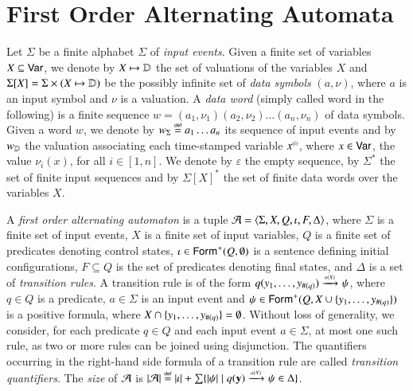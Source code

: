 \section{First Order Alternating Automata}

Let $\Sigma$ be a finite alphabet $\Sigma$ of \emph{input
  events}. Given a finite set of variables $X \subseteq \mathsf{Var}$, we
denote by $X \mapsto \mathbb{D}$ the set of valuations of the variables $X$
and $\Sigma[X] = \Sigma \times (X \mapsto \mathbb{D})$ be the possibly
infinite set of \emph{data symbols} $(a,\nu)$, where $a$ is an input
symbol and $\nu$ is a valuation. A \emph{data word} (simply called
word in the following) is a finite sequence $w=(a_1,\nu_1)(a_2,\nu_2)
\ldots (a_n,\nu_n)$ of data symbols. Given a word $w$, we denote by
${w}_\Sigma \stackrel{\scriptscriptstyle{\mathsf{def}}}{=} a_1\ldots a_n$ its sequence of input events and by
${w}_{\mathbb{D}}$ the valuation associating each time-stamped variable
${x}^{\scriptscriptstyle{({i})}}$, where $x \in \mathsf{Var}$, the value $\nu_i(x)$, for all
$i\in[1,n]$. We denote by $\varepsilon$ the empty sequence, by
$\Sigma^*$ the set of finite input sequences and by $\Sigma[X]^*$ the
set of finite data words over the variables $X$.

A \emph{first order alternating automaton} is a tuple $\mathcal{A} =
\langle \Sigma,X,Q,\iota,F,\Delta \rangle$, where $\Sigma$ is a finite set of
input events, $X$ is a finite set of input variables, $Q$ is a finite
set of predicates denoting control states, $\iota \in
\mathsf{Form}^+(Q,\emptyset)$ is a sentence defining initial configurations,
$F \subseteq Q$ is the set of predicates denoting final states, and
$\Delta$ is a set of \emph{transition rules}. A transition rule is of
the form \(q(y_1,\ldots,y_{\#(q)}) \xrightarrow{{\scriptscriptstyle a(X)}}_{{\scriptstyle }} \psi\), where $q \in
Q$ is a predicate, $a \in \Sigma$ is an input event and $\psi \in
\mathsf{Form}^+(Q,X \cup \{ y_1,\ldots,y_{\#(q)} \})$ is a positive formula,
where $X \cap \{ y_1,\ldots,y_{\#(q)} \} = \emptyset$.  Without loss
of generality, we consider, for each predicate $q \in Q$ and each
input event $a \in \Sigma$, at most one such rule, as two or more
rules can be joined using disjunction. The quantifiers occurring in
the right-hand side formula of a transition rule are called
\emph{transition quantifiers}. The \emph{size} of $\mathcal{A}$ is ${|{\mathcal{A}}|}
\stackrel{\scriptscriptstyle{\mathsf{def}}}{=} {|{\iota}|} + \sum \{ {|{\psi}|} \mid q(\mathbf y)
  \xrightarrow{{\scriptscriptstyle a(X)}}_{{\scriptstyle }} \psi \in \Delta \}$.


